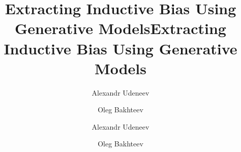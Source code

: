 \ifdgruyterstyle
  \aop

  \title{Extracting Inductive Bias Using Generative Models}
  \author[1]{Alexandr Udeneev}
  \author[2]{Oleg Bakhteev}


  \abstract{}
  \maketitle
\else
  \title{Extracting Inductive Bias Using Generative Models}
  \author{Alexandr Udeneev \and Oleg Bakhteev}
  \date{}
  \maketitle

  \begin{abstract}
    
  \end{abstract}
\fi
